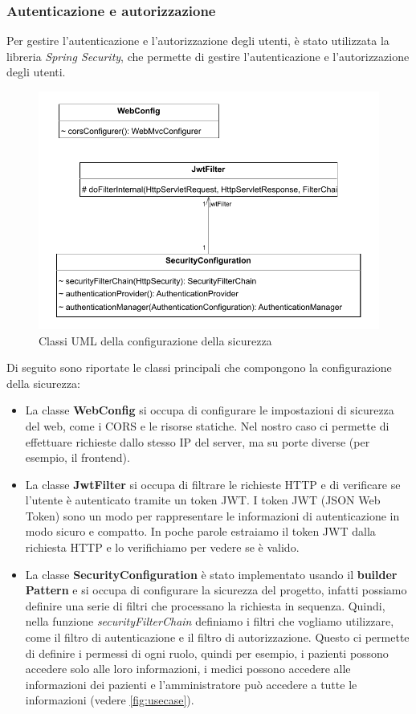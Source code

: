 \documentclass[a4paper]{article}
\begin{document}
\subsubsection{Autenticazione e autorizzazione}

Per gestire l'autenticazione e l'autorizzazione degli utenti, è stato utilizzata la libreria \textit{Spring Security}, che permette di gestire
l'autenticazione e l'autorizzazione degli utenti. 

\begin{figure}[H]
  \begin{center}
    \includegraphics[width=1\textwidth]{config.pdf}
  \end{center}
  \caption{Classi UML della configurazione della sicurezza} 
\end{figure}
\noindent
Di seguito sono riportate le classi principali che compongono la configurazione della sicurezza:
\begin{itemize}
  \item La classe \textbf{WebConfig} si occupa di configurare le impostazioni di sicurezza del web, come i CORS e le risorse statiche.
  Nel nostro caso ci permette di effettuare richieste dallo stesso IP del server, ma su porte diverse (per esempio, il frontend).
  \item La classe \textbf{JwtFilter} si occupa di filtrare le richieste HTTP e di verificare se l'utente è autenticato tramite un token JWT.
  I token JWT (JSON Web Token) sono un modo per rappresentare le informazioni di autenticazione in modo sicuro e compatto.
  In poche parole estraiamo il token JWT dalla richiesta HTTP e lo verifichiamo per vedere se è valido.
  \item La classe \textbf{SecurityConfiguration} è stato implementato usando il \textbf{builder Pattern} e si occupa di configurare la sicurezza del progetto,
  infatti possiamo definire una serie di filtri che processano la richiesta in sequenza.
  Quindi, nella funzione \textit{securityFilterChain} definiamo i filtri che vogliamo utilizzare, come il filtro di autenticazione e il filtro di autorizzazione.
  Questo ci permette di definire i permessi di ogni ruolo, quindi per esempio, i pazienti possono accedere solo alle loro informazioni, i medici possono accedere alle informazioni dei pazienti 
  e l'amministratore può accedere a tutte le informazioni (vedere \ref{fig:usecase}).
\end{itemize}
\end{document}
